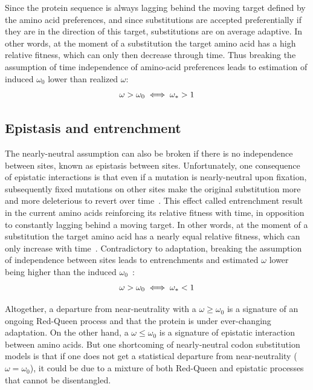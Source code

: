 Since the protein sequence is always lagging behind the moving target defined by the amino acid preferences, and since substitutions are accepted preferentially if they are in the direction of this target, substitutions are on average adaptive.
In other words, at the moment of a substitution the target amino acid has a high relative fitness, which can only then decrease through time.
Thus breaking the assumption of time independence of amino-acid preferences leads to estimation of induced $\omega_0$ lower than realized $\omega$:
\begin{equation}
    \omega > \omega_0 \\
    \iff \omega_* > 1
\end{equation}

\subsection{Epistasis and entrenchment}
\label{subsec:epistasis-and-entrenchment}

The nearly-neutral assumption can also be broken if there is no independence between sites, known as epistasis between sites.
Unfortunately, one consequence of epistatic interactions is that even if a mutation is nearly-neutral upon fixation, subsequently fixed mutations on other sites make the original substitution more and more deleterious to revert over time~\citep{Gong2014, Lunzer2010, Mccandlish2013}.
This effect called entrenchment result in the current amino acids reinforcing its relative fitness with time, in opposition to constantly lagging behind a moving target.
In other words, at the moment of a substitution the target amino acid has a nearly equal relative fitness, which can only increase with time~\citep{Goldstein2016, Goldstein2017}.
Contradictory to adaptation, breaking the assumption of independence between sites leads to entrenchments and estimated $\omega$ lower being higher than the induced $\omega_0$~\citep{Rodrigue2016}:
\begin{equation}
    \omega > \omega_0 \\
    \iff \omega_* < 1
\end{equation}

Altogether, a departure from near-neutrality with a $\omega \geq \omega_0$ is a signature of an ongoing Red-Queen process and that the protein is under ever-changing adaptation.
On the other hand, a $\omega \leq \omega_0$ is a signature of epistatic interaction between amino acids.
But one shortcoming of nearly-neutral codon substitution models is that if one does not get a statistical departure from near-neutrality ($\omega = \omega_0$), it could be due to a mixture of both Red-Queen and epistatic processes that cannot be disentangled.